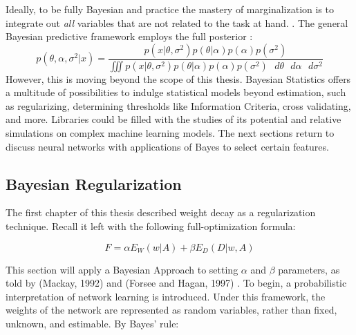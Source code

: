 
Ideally, to be fully Bayesian and practice the mastery of marginalization is to integrate out \textit{all} variables that are not related to the task at hand. \cite{bishop2006pattern}.  The general Bayesian predictive framework employs the full posterior \cite{tipping2004bayesian}:
$$
p(\theta,\alpha,\sigma^2|x) = \frac{p(x|\theta,\sigma^2) p(\theta|\alpha)p(\alpha)p(\sigma^2)}{\iiint p(x|\theta,\sigma^2)p(\theta|\alpha)p(\alpha)p(\sigma^2) \text{ } d\theta \text{ } d\alpha \text{ } d\sigma^2}
$$
However, this is moving beyond the scope of this thesis.  Bayesian Statistics offers a multitude of possibilities to indulge statistical models beyond estimation, such as regularizing, determining thresholds like Information Criteria, cross validating, and more.  Libraries could be filled with the studies of its potential and relative simulations on complex machine learning models.  The next sections return to discuss neural networks with applications of Bayes to select certain features.

\begin{comment}
\subsection{Predictive Accuracy Measures}
I feel I need to put Bayes-CV somewhere...

Mention of their frequentist analog (for lppd is is the log-probability score on Rethinking p. 214)

\textbf{Bayesian Cross-Validation} to get the log-pointwise predictive density
$$
lppd_{CV} = \sum_{i=1}^N \frac{1}{S} \sum_{s=1}^S logP(w_i|\theta_{-i,s})
$$

\textbf{Information Criteria} also found in Rethinking (p. 223) and BDA (p. 169)
\end{comment}

\subsection{Bayesian Regularization}


The first chapter of this thesis described weight decay as a regularization technique.  Recall it left with the following full-optimization formula:

$$
F = \alpha E_W(w|A) + \beta E_D(D|w,A)
$$



This section will apply a Bayesian Approach to setting $\alpha$ and $\beta$ parameters, as told by (Mackay, 1992) \cite{mackay1992practical} and (Forsee and Hagan, 1997) \cite{foresee1997gauss}.  To begin, a probabilistic interpretation of network learning \cite{mackay1992practical} is introduced.  Under this framework, the weights of the network are represented as random variables, rather than fixed, unknown, and estimable.  By Bayes' rule:
 
